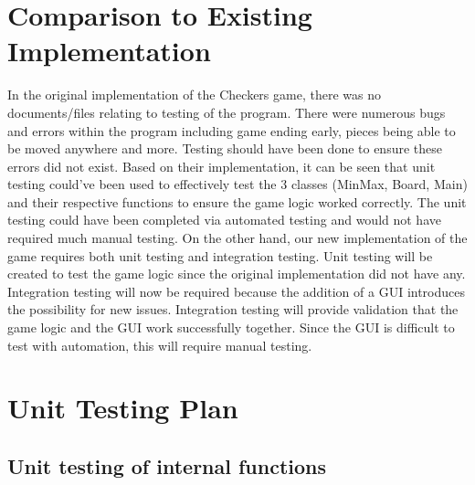 \documentclass[12pt, titlepage]{article}
\begin{document}
	
\section{Comparison to Existing Implementation}
In the original implementation of the Checkers game, there was no documents/files relating to testing of the program. There were numerous bugs and errors within the program including game ending early, pieces being able to be moved anywhere and more. Testing should have been done to ensure these errors did not exist. Based on their implementation, it can be seen that unit testing could've been used to effectively test the 3 classes (MinMax, Board, Main) and their respective functions to ensure the game logic worked correctly. The unit testing could have been completed via automated testing and would not have required much manual testing. On the other hand, our new implementation of the game requires both unit testing and integration testing. Unit testing will be created to test the game logic since the original implementation did not have any. Integration testing will now be required because the addition of a GUI introduces the possibility for new issues. Integration testing will provide validation that the game logic and the GUI work successfully together. Since the GUI is difficult to test with automation, this will require manual testing.
				
\section{Unit Testing Plan}
		
\subsection{Unit testing of internal functions}
\end{document}

